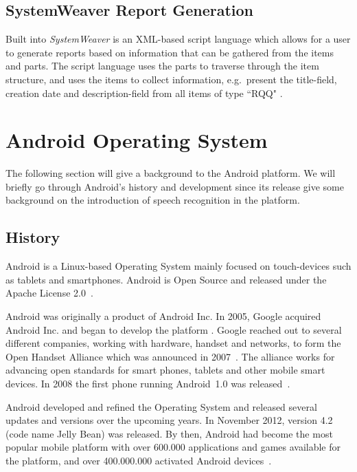 \subsection{SystemWeaver Report Generation}
Built into \emph{SystemWeaver} is an XML-based script language which allows for a user to generate reports based on information that can be gathered from the items and parts. The script language uses the parts to traverse through the item structure, and uses the items to collect information, e.g.\ present the title-field, creation date and description-field from all items of type ``RQQ" \citep{systemweaverHelpdoc}.

\section{Android Operating System}
The following section will give a background to the Android platform. We will briefly go through Android's history and development since its release give some background on the introduction of speech recognition in the platform.

\subsection{History}
Android is a Linux-based Operating System mainly focused on touch-devices such as tablets and smartphones. Android is Open Source and released under the Apache License 2.0~\citep{andlicense}.

Android was originally a product of Android Inc. In 2005, Google acquired Android Inc. and began to develop the platform \citep{androidAquire}. Google reached out to several different companies, working with hardware, handset and networks, to form the Open Handset Alliance which was announced in 2007~\citep{openhandsetalliance}. The alliance works for advancing open standards for smart phones, tablets and other mobile smart devices. In 2008 the first phone running Android~1.0 was released~\citep{helalBose,andrelease}. 

Android developed and refined the Operating System and released several updates and versions over the upcoming years. In November 2012, version 4.2 (code name Jelly Bean) was released. By then, Android had become the most popular mobile platform with over 600.000 applications and games available for the platform, and over 400.000.000 activated Android devices~\citep{androidhome}.


